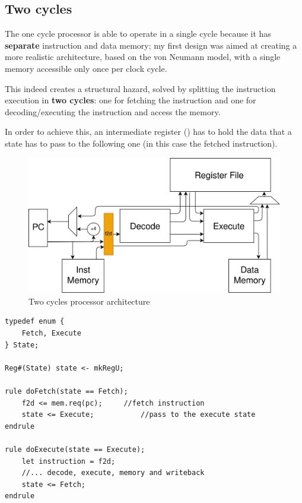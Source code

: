 \documentclass[12pt,oneside,a4paper]{article}
\begin{document}
\subsection{Two cycles}
The one cycle processor is able to operate in a single cycle because it has \textbf{separate} instruction and data memory; my first design was aimed at creating a more realistic architecture, based on the von Neumann model, with a single memory accessible only once per clock cycle.

This indeed creates a structural hazard, solved by splitting the instruction execution in \textbf{two cycles}: one for fetching the instruction and one for decoding/executing the instruction and access the memory.

In order to achieve this, an intermediate register ({\selectfont{f2d}}) has to hold the data that a state has to pass to the following one (in this case the fetched instruction).

\begin{figure}[h]
	\centering
	\includegraphics[scale=0.8]{twocycle.png}
	\caption{Two cycles processor architecture}
	\label{twocycle}
\end{figure}

\begin{lstlisting}[label={twocyclecode},caption={Two cycle processor simplified code}]
typedef enum {
	Fetch, Execute
} State;

Reg#(State) state <- mkRegU;

rule doFetch(state == Fetch);      
	f2d <= mem.req(pc);		//fetch instruction
	state <= Execute;			//pass to the execute state
endrule

rule doExecute(state == Execute);
	let instruction = f2d;
	//... decode, execute, memory and writeback
	state <= Fetch;	
endrule
\end{lstlisting}
\end{document}
